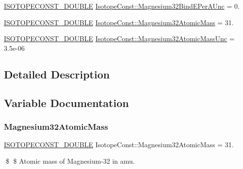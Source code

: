 \begin{DoxyCompactItemize}
\mbox{\hyperlink{group___isotope_const-_macros_ga8f45a7272ce02c0b4c65c44636ed719a}{I\+S\+O\+T\+O\+P\+E\+C\+O\+N\+S\+T\+\_\+\+D\+O\+U\+B\+LE}} \mbox{\hyperlink{group___isotope_const-_magnesium-_mg32_ga96d9fdf81593577757bc50bbb2c805f2}{Isotope\+Const\+::\+Magnesium32\+Bind\+E\+Per\+A\+Unc}} = 0.
\item 
\mbox{\hyperlink{group___isotope_const-_macros_ga8f45a7272ce02c0b4c65c44636ed719a}{I\+S\+O\+T\+O\+P\+E\+C\+O\+N\+S\+T\+\_\+\+D\+O\+U\+B\+LE}} \mbox{\hyperlink{group___isotope_const-_magnesium-_mg32_ga8e798c6467b1f53c86572c5f8882a53f}{Isotope\+Const\+::\+Magnesium32\+Atomic\+Mass}} = 31.
\item 
\mbox{\hyperlink{group___isotope_const-_macros_ga8f45a7272ce02c0b4c65c44636ed719a}{I\+S\+O\+T\+O\+P\+E\+C\+O\+N\+S\+T\+\_\+\+D\+O\+U\+B\+LE}} \mbox{\hyperlink{group___isotope_const-_magnesium-_mg32_ga152bb09da8f6e3549c1305648746198d}{Isotope\+Const\+::\+Magnesium32\+Atomic\+Mass\+Unc}} = 3.\+5e-\/06
\end{DoxyCompactItemize}


\subsection{Detailed Description}


\subsection{Variable Documentation}
\mbox{\label{group___isotope_const-_magnesium-_mg32_ga8e798c6467b1f53c86572c5f8882a53f}} 
\subsubsection{\texorpdfstring{Magnesium32\+Atomic\+Mass}{Magnesium32AtomicMass}}
{\footnotesize\ttfamily \mbox{\hyperlink{group___isotope_const-_macros_ga8f45a7272ce02c0b4c65c44636ed719a}{I\+S\+O\+T\+O\+P\+E\+C\+O\+N\+S\+T\+\_\+\+D\+O\+U\+B\+LE}} Isotope\+Const\+::\+Magnesium32\+Atomic\+Mass = 31.}

\$ \$ Atomic mass of Magnesium-\/32 in amu. \mbox{\label{group___isotope_const-_magnesium-_mg32_ga152bb09da8f6e3549c1305648746198d}} 
